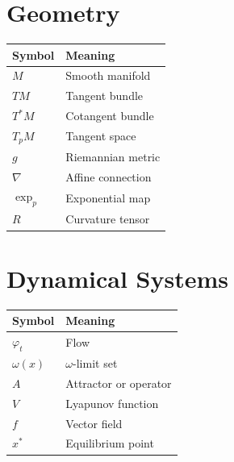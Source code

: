\documentclass[11pt]{book}
\numberwithin{equation}{chapter}
\theoremstyle{definition}
\theoremstyle{plain}
\begin{document}

\section{Geometry}

\begin{center}

\begin{tabular}{ll}

Symbol & Meaning
\\
\hline

$M$ &
Smooth manifold
\\

$TM$ &
Tangent bundle
\\

$T^*M$ &
Cotangent bundle
\\

$T_pM$ &
Tangent space
\\

$g$ &
Riemannian metric
\\

$\nabla$ &
Affine connection
\\

$\exp_p$ &
Exponential map
\\

$R$ &
Curvature tensor

\end{tabular}

\end{center}


\section{Dynamical Systems}

\begin{center}

\begin{tabular}{ll}

Symbol & Meaning
\\
\hline

$\varphi_t$ &
Flow
\\

$\omega(x)$ &
$\omega$-limit set
\\

$A$ &
Attractor or operator
\\

$V$ &
Lyapunov function
\\

$f$ &
Vector field
\\

$x^*$ &
Equilibrium point

\end{tabular}

\end{center}
\end{document}
